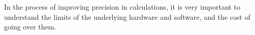
In the process of improving precision in calculations, it is very important to understand the limits of the underlying hardware and software, and the cost of going over them.

